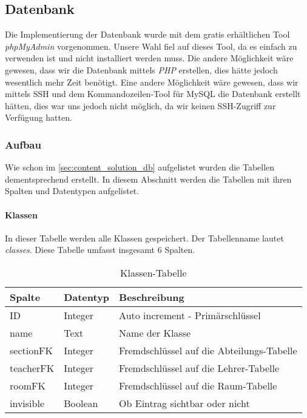 \subsection{Datenbank}
Die Implementierung der Datenbank wurde mit dem gratis erhältlichen Tool \textit{phpMyAdmin} vorgenommen. Unsere Wahl fiel auf dieses Tool, da es einfach zu verwenden ist und nicht installiert werden muss. Die andere Möglichkeit wäre gewesen, dass wir die Datenbank mittels \textit{PHP} erstellen, dies hätte jedoch wesentlich mehr Zeit benötigt. Eine andere Möglichkeit wäre gewesen, dass wir mittels SSH und dem Kommandozeilen-Tool für MySQL die Datenbank erstellt hätten, dies war uns jedoch nicht möglich, da wir keinen SSH-Zugriff zur Verfügung hatten.
\subsubsection{Aufbau} \label{sec:content_imple_db_aufbau}
%
Wie schon im \autoref{sec:content_solution_db} aufgelistet wurden die Tabellen dementsprechend erstellt. In diesem Abschnitt werden die Tabellen mit ihren Spalten und Datentypen aufgelistet.\\

\paragraph{Klassen\\}
In dieser Tabelle werden alle Klassen gespeichert. Der Tabellenname lautet \textit{classes}. Diese Tabelle umfasst insgesamt 6 Spalten.
\begin{table}[H]
\centering
\begin{tabular}{p{2.5 cm}p{2.5 cm}p{10 cm}}
   \toprule
   \textbf{Spalte} & \textbf{Datentyp} & \textbf{Beschreibung} \\
   \midrule
          ID & Integer & Auto increment - Primärschlüssel  \\
          \hline
          name & Text & Name der Klasse \\
          \hline
          sectionFK & Integer & Fremdschlüssel auf die Abteilungs-Tabelle \\
          \hline
          teacherFK & Integer & Fremdschlüssel auf die Lehrer-Tabelle\\
          \hline
          roomFK & Integer & Fremdschlüssel auf die Raum-Tabelle\\
          \hline
          invisible & Boolean & Ob Eintrag sichtbar oder nicht\\
   \bottomrule
\end{tabular}
\caption{Klassen-Tabelle}
\end{table}

